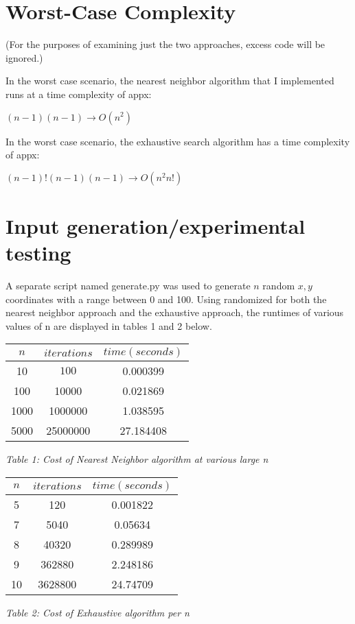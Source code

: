 \documentclass[11pt]{article}
\newcommand\tab[1][.5in]{\hspace*{#1}}
\begin{document}
\section{Worst-Case Complexity}
\begin{center}
(For the purposes of examining just the two approaches, excess code will be ignored.)\par
\end{center}
\tab In the worst case scenario, the nearest neighbor algorithm that I implemented runs at a time complexity of appx:\\
\begin{center}
$(n-1)(n-1) \rightarrow O(n^2)$\\
\end{center}
\tab In the worst case scenario, the exhaustive search algorithm has a time complexity of appx:\\
\begin{center}
$(n-1)!(n-1)(n-1) \rightarrow O(n^2n!)$
\end{center}

\newpage

\section{Input generation/experimental testing}
\tab A separate script named generate.py was used to generate $n$ random $x,y$ coordinates with a range between 0 and 100. Using randomized for both the nearest neighbor approach and the exhaustive approach, the runtimes of various values of n are displayed in tables 1 and 2 below.\\
\begin{center}
\begin{tabular}{c | c | c }
$n$&$iterations$&$time (seconds)$\\
\hline
10&$100$&0.000399\\
100&10000&0.021869\\
1000&1000000&1.038595\\
5000&25000000&27.184408\\
\end{tabular}\par
\vspace{0.25cm}
\textit{Table 1: Cost of Nearest Neighbor algorithm at various large n}

\vspace{1cm}
\begin{tabular}{c | c | c}
$n$&$iterations$&$time (seconds)$\\
\hline
5&120&0.001822\\
7&5040&0.05634\\
8&40320&0.289989\\
9&362880&2.248186\\
10&3628800&24.74709\\
\end{tabular}\par
\vspace{0.25cm}
\textit{Table 2: Cost of Exhaustive algorithm per n}
\end{center}
\end{document}
